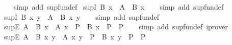 \begin{isabellebody}
%
\isadelimproof
\ \ %
\endisadelimproof
%
\isatagproof
{}\isamarkupfalse%
\ {\isacharparenleft}{\kern0pt}simp\ add{\isacharcolon}{\kern0pt}\ sup{\isacharunderscore}{\kern0pt}fun{\isacharunderscore}{\kern0pt}def{\isacharparenright}{\kern0pt}%
\endisatagproof
{\isafoldproof}%
%
\isadelimproof
\isanewline
%
\endisadelimproof
\isanewline
{}\isamarkupfalse%
\ sup{}I{}{\isacharcolon}{\kern0pt}\ {\isachardoublequoteopen}B\ x\ {\isasymLongrightarrow}\ {\isacharparenleft}{\kern0pt}A\ {\isasymsqunion}\ B{\isacharparenright}{\kern0pt}\ x{\isachardoublequoteclose}\isanewline
%
\isadelimproof
\ \ %
\endisadelimproof
%
\isatagproof
{}\isamarkupfalse%
\ {\isacharparenleft}{\kern0pt}simp\ add{\isacharcolon}{\kern0pt}\ sup{\isacharunderscore}{\kern0pt}fun{\isacharunderscore}{\kern0pt}def{\isacharparenright}{\kern0pt}%
\endisatagproof
{\isafoldproof}%
%
\isadelimproof
\isanewline
%
\endisadelimproof
\isanewline
{}\isamarkupfalse%
\ sup{}I{}{\isacharcolon}{\kern0pt}\ {\isachardoublequoteopen}B\ x\ y\ {\isasymLongrightarrow}\ {\isacharparenleft}{\kern0pt}A\ {\isasymsqunion}\ B{\isacharparenright}{\kern0pt}\ x\ y{\isachardoublequoteclose}\isanewline
%
\isadelimproof
\ \ %
\endisadelimproof
%
\isatagproof
{}\isamarkupfalse%
\ {\isacharparenleft}{\kern0pt}simp\ add{\isacharcolon}{\kern0pt}\ sup{\isacharunderscore}{\kern0pt}fun{\isacharunderscore}{\kern0pt}def{\isacharparenright}{\kern0pt}%
\endisatagproof
{\isafoldproof}%
%
\isadelimproof
\isanewline
%
\endisadelimproof
\isanewline
{}\isamarkupfalse%
\ sup{}E{\isacharcolon}{\kern0pt}\ {\isachardoublequoteopen}{\isacharparenleft}{\kern0pt}A\ {\isasymsqunion}\ B{\isacharparenright}{\kern0pt}\ x\ {\isasymLongrightarrow}\ {\isacharparenleft}{\kern0pt}A\ x\ {\isasymLongrightarrow}\ P{\isacharparenright}{\kern0pt}\ {\isasymLongrightarrow}\ {\isacharparenleft}{\kern0pt}B\ x\ {\isasymLongrightarrow}\ P{\isacharparenright}{\kern0pt}\ {\isasymLongrightarrow}\ P{\isachardoublequoteclose}\isanewline
%
\isadelimproof
\ \ %
\endisadelimproof
%
\isatagproof
{}\isamarkupfalse%
\ {\isacharparenleft}{\kern0pt}simp\ add{\isacharcolon}{\kern0pt}\ sup{\isacharunderscore}{\kern0pt}fun{\isacharunderscore}{\kern0pt}def{\isacharparenright}{\kern0pt}\ iprover%
\endisatagproof
{\isafoldproof}%
%
\isadelimproof
\isanewline
%
\endisadelimproof
\isanewline
{}\isamarkupfalse%
\ sup{}E{\isacharcolon}{\kern0pt}\ {\isachardoublequoteopen}{\isacharparenleft}{\kern0pt}A\ {\isasymsqunion}\ B{\isacharparenright}{\kern0pt}\ x\ y\ {\isasymLongrightarrow}\ {\isacharparenleft}{\kern0pt}A\ x\ y\ {\isasymLongrightarrow}\ P{\isacharparenright}{\kern0pt}\ {\isasymLongrightarrow}\ {\isacharparenleft}{\kern0pt}B\ x\ y\ {\isasymLongrightarrow}\ P{\isacharparenright}{\kern0pt}\ {\isasymLongrightarrow}\ P{\isachardoublequoteclose}\isanewline

\end{isabellebody}
